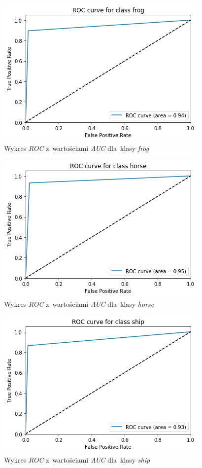 \documentclass[11pt, a4paper]{article}
\begin{document}
\begin{figure}[H]
\centering
    \includegraphics[scale=0.8]{roc_6.png}
    \caption{Wykres \textit{ROC} z~wartościami \textit{AUC} dla~klasy \textit{frog}}
\end{figure}
\begin{figure}[H]
\centering
    \includegraphics[scale=0.8]{roc_7.png}
    \caption{Wykres \textit{ROC} z~wartościami \textit{AUC} dla~klasy \textit{horse}}
\end{figure}
\begin{figure}[H]
\centering
    \includegraphics[scale=0.8]{roc_8.png}
    \caption{Wykres \textit{ROC} z~wartościami \textit{AUC} dla~klasy \textit{ship}}
\end{figure}
\end{document}
